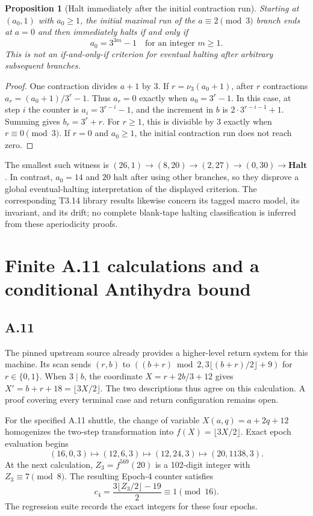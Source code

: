 \documentclass[11pt]{article}
\DeclareRobustCommand{\_}{\ifmmode\sb\else\textunderscore\allowbreak\fi}
\newtheorem{proposition}[theorem]{Proposition}
\theoremstyle{definition}
\theoremstyle{remark}
\newcommand{\Halt}{\mathbf{Halt}}
\begin{document}
\begin{proposition}[Halt immediately after the initial contraction run]
Starting at $(a_0,1)$ with $a_0\ge1$, the initial maximal run of the $a\equiv2\pmod3$ branch ends at $a=0$ and then immediately halts if and only if
\[
a_0=3^{3m}-1\quad\text{for an integer }m\ge1.
\]
This is not an if-and-only-if criterion for eventual halting after arbitrary subsequent branches.
\end{proposition}
\begin{proof}
One contraction divides $a+1$ by 3. If $r=\nu_3(a_0+1)$, after $r$ contractions $a_r=(a_0+1)/3^r-1$. Thus $a_r=0$ exactly when $a_0=3^r-1$. In this case, at step $i$ the counter is $a_i=3^{r-i}-1$, and the increment in $b$ is $2\cdot3^{r-i-1}+1$. Summing gives $b_r=3^r+r$. For $r\ge1$, this is divisible by 3 exactly when $r\equiv0\pmod3$. If $r=0$ and $a_0\ge1$, the initial contraction run does not reach zero.
\end{proof}
The smallest such witness is $(26,1)\to(8,20)\to(2,27)\to(0,30)\to\Halt$. In contrast, $a_0=14$ and $20$ halt after using other branches, so they disprove a global eventual-halting interpretation of the displayed criterion. The corresponding T3.14 library results likewise concern its tagged macro model, its invariant, and its drift; no complete blank-tape halting classification is inferred from these aperiodicity proofs.

\section{Finite A.11 calculations and a conditional Antihydra bound}
\label{sec:conditional}
\subsection{A.11}
The pinned upstream source already provides a higher-level return system for this machine. Its scan sends $(r,b)$ to $((b+r)\bmod2,3\lfloor(b+r)/2\rfloor+9)$ for $r\in\{0,1\}$. When $3\mid b$, the coordinate $X=r+2b/3+12$ gives $X'=b+r+18=\lfloor3X/2\rfloor$. The two descriptions thus agree on this calculation. A proof covering every terminal case and return configuration remains open.

For the specified A.11 shuttle, the change of variable $X(a,q)=a+2q+12$ homogenizes the two-step transformation into $f(X)=\lfloor3X/2\rfloor$. Exact epoch evaluation begins
\[
(16,0,3)\longmapsto(12,6,3)\longmapsto(12,24,3)
\longmapsto(20,1138,3).
\]
At the next calculation, $Z_3=f^{569}(20)$ is a 102-digit integer with $Z_3\equiv7\pmod8$. The resulting Epoch-4 counter satisfies
\[
c_4=\frac{3\lfloor Z_3/2\rfloor-19}{2}\equiv1\pmod{16}.
\]
The regression suite records the exact integers for these four epochs.
\end{document}
